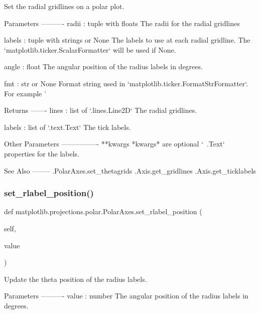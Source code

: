 \begin{DoxyVerb}Set the radial gridlines on a polar plot.

Parameters
----------
radii : tuple with floats
    The radii for the radial gridlines

labels : tuple with strings or None
    The labels to use at each radial gridline. The
    `matplotlib.ticker.ScalarFormatter` will be used if None.

angle : float
    The angular position of the radius labels in degrees.

fmt : str or None
    Format string used in `matplotlib.ticker.FormatStrFormatter`.
    For example '%

Returns
-------
lines : list of `.lines.Line2D`
    The radial gridlines.

labels : list of `.text.Text`
    The tick labels.

Other Parameters
----------------
**kwargs
    *kwargs* are optional `~.Text` properties for the labels.

See Also
--------
.PolarAxes.set_thetagrids
.Axis.get_gridlines
.Axis.get_ticklabels
\end{DoxyVerb}
 \mbox{\label{classmatplotlib_1_1projections_1_1polar_1_1PolarAxes_a5f8fa9103ae550a399366e61eb7b8c36}} 
\subsubsection{\texorpdfstring{set\+\_\+rlabel\+\_\+position()}{set\_rlabel\_position()}}
{\footnotesize\ttfamily def matplotlib.\+projections.\+polar.\+Polar\+Axes.\+set\+\_\+rlabel\+\_\+position (\begin{DoxyParamCaption}\item[{}]{self,  }\item[{}]{value }\end{DoxyParamCaption})}

\begin{DoxyVerb}Update the theta position of the radius labels.

Parameters
----------
value : number
    The angular position of the radius labels in degrees.
\end{DoxyVerb}
 \mbox{\label{classmatplotlib_1_1projections_1_1polar_1_1PolarAxes_ae7838693fa81e830d5ba18ad144d08d7}} 
